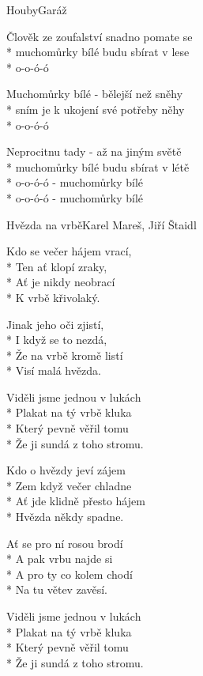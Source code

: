 \documentclass[10.5pt]{book}
\begin{document}
\begin{poem}{Houby}{Garáž}

\settowidth{\versewidth}{Člověk ze zoufalství snadno pomate se}

Člověk ze zoufalství snadno pomate se\\*
muchomůrky bílé budu sbírat v lese\\*
o-o-ó-ó

Muchomůrky bílé - bělejší než sněhy\\*
sním je k ukojení své potřeby něhy\\*
o-o-ó-ó

Neprocitnu tady - až na jiným světě\\*
muchomůrky bílé budu sbírat v létě\\*
o-o-ó-ó - muchomůrky bílé\\*
o-o-ó-ó - muchomůrky bílé 

\end{poem}

\begin{poem}{Hvězda na vrbě}{Karel Mareš, Jiří Štaidl}

\settowidth{\versewidth}{Viděli jsme jednou v lukách}

Kdo se večer hájem vrací,\\*
Ten ať klopí zraky,\\*
Ať je nikdy neobrací\\*
K vrbě křivolaký.

Jinak jeho oči zjistí,\\*
I když se to nezdá,\\*
Že na vrbě kromě listí\\*
Visí malá hvězda.

Viděli jsme jednou v lukách\\*
Plakat na tý vrbě kluka\\*
Který pevně věřil tomu\\*
Že ji sundá z toho stromu.

Kdo o hvězdy jeví zájem\\*
Zem když večer chladne\\*
Ať jde klidně přesto hájem\\*
Hvězda někdy spadne.

Ať se pro ní rosou brodí\\*
A pak vrbu najde si\\*
A pro ty co kolem chodí\\*
Na tu větev zavěsí.

Viděli jsme jednou v lukách\\*
Plakat na tý vrbě kluka\\*
Který pevně věřil tomu\\*
Že ji sundá z toho stromu.

\end{poem}
\end{document}
